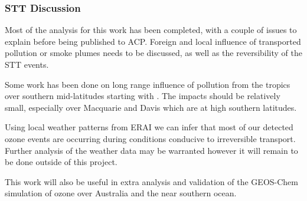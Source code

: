 \subsubsection{STT Discussion}

Most of the analysis for this work has been completed, with a couple of issues to explain before being published to ACP.
Foreign and local influence of transported pollution or smoke plumes needs to be discussed, as well as the reversibility of the STT events.

Some work has been done on long range influence of pollution from the tropics over southern mid-latitudes starting with \citet{Pak_2003}. The impacts should be relatively small, especially over Macquarie and Davis which are at high southern latitudes.

Using local weather patterns from ERAI we can infer that most of our detected ozone events are occurring during conditions conducive to irreversible transport. Further analysis of the weather data may be warranted however it will remain to be done outside of this project.

This work will also be useful in extra analysis and validation of the GEOS-Chem simulation of ozone over Australia and the near southern ocean.
